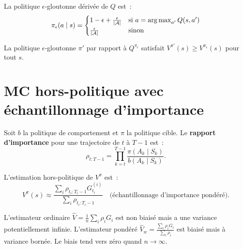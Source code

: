 \begin{definition}
La politique $\epsilon$-gloutonne d\'eriv\'ee de $Q$ est~:
\[
    \pi_\epsilon(a \mid s) = \begin{cases}
        1 - \epsilon + \frac{\epsilon}{|\mathcal{A}|} & \text{si } a = \operatorname*{arg\,max}_{a'} Q(s,a') \\
        \frac{\epsilon}{|\mathcal{A}|} & \text{sinon}
    \end{cases}
\]
\end{definition}

\begin{theoreme}
La politique $\epsilon$-gloutonne $\pi'$ par rapport \`a $Q^{\pi_\epsilon}$
satisfait $V^{\pi'}(s) \geq V^{\pi_\epsilon}(s)$ pour tout $s$.
\end{theoreme}

\section{MC hors-politique avec \'echantillonnage d'importance}

\begin{definition}
Soit $b$ la politique de comportement et $\pi$ la politique cible. Le
\textbf{rapport d'importance} pour une trajectoire de $t$ \`a $T-1$ est~:
\[
    \rho_{t:T-1} = \prod_{k=t}^{T-1} \frac{\pi(A_k \mid S_k)}{b(A_k \mid S_k)}.
\]
\end{definition}

\begin{formules}[title=\textbf{Estimateur MC hors-politique}]
L'estimation hors-politique de $V^\pi$ est~:
\[
    V^\pi(s) \approx \frac{\sum_{i} \rho_{t_i:T_i-1} G_{t_i}^{(i)}}
    {\sum_{i} \rho_{t_i:T_i-1}}
    \quad \text{(\'echantillonnage d'importance pond\'er\'e)}.
\]
\end{formules}

\begin{proposition}
L'estimateur ordinaire $\hat{V} = \frac{1}{n}\sum_i \rho_i G_i$ est non biais\'e
mais a une variance potentiellement infinie. L'estimateur pond\'er\'e
$\hat{V}_w = \frac{\sum_i \rho_i G_i}{\sum_i \rho_i}$ est biais\'e mais \`a
variance born\'ee. Le biais tend vers z\'ero quand $n \to \infty$.
\end{proposition}

